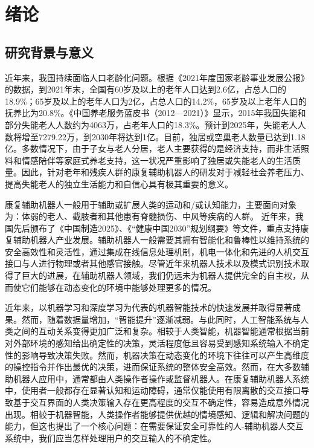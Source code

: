 
\chapter{绪论}

\section{研究背景与意义}
近年来，我国持续面临人口老龄化问题。根据《2021年度国家老龄事业发展公报》的数据\cite{2021NianDuGuoJiaLaoLingShiYeFaZhanGongBao}，到2021年末，全国有60岁及以上的老年人口达到2.6亿，占总人口的18.9\%；65岁及以上的老年人口为2亿，占总人口的14.2\%，65岁及以上老年人口的抚养比为20.8\%。《中国养老服务蓝皮书（2012—2021）》\cite{YangZhongGuoYangLaoFuWuLanPiShu201220212022}显示，2015年我国失能和部分失能老人人数约为4063万，占老年人口的18.3\%。预计到2025年，失能老人人数将增至7279.22万，到2030年将达到1亿。目前，独居或空巢老人数量已达到1.18亿。多数情况下，由于子女与老人分居，老人主要获得的是经济支持，而非生活照料和情感陪伴等家庭式养老支持，这一状况严重影响了独居或失能老人的生活质量。因此，针对老年和残疾人群的康复辅助机器人的研发对于减轻社会养老压力、提高失能老人的独立生活能力和自信心具有极其重要的意义。

康复辅助机器人一般用于辅助或扩展人类的运动和/或认知能力，主要面向对象为：体弱的老人、截肢者和其他患有脊髓损伤、中风等疾病的人群。 近年来，我国先后颁布了《中国制造2025》\cite{ZhongGuoZhiZao2025}、《“健康中国2030”规划纲要》\cite{LiuYangJianKangZhongGuo2030GuiHuaGangYao}等文件，重点支持康复辅助机器人产业发展。辅助机器人一般需要其拥有智能化和鲁棒性以维持系统的安全高效性和灵活性，通过集成在线信息处理机制，机电一体化和先进的人机交互接口与人进行物理或者其他感官接触。尽管近年来机器人技术以及模式识别技术取得了巨大的进展，在辅助机器人领域，我们仍远未为机器人提供完全的自主权，从而使它们能够在动态变化的环境中能够处理更多的情况。

近年来，以机器学习和深度学习为代表的机器智能技术的快速发展并取得显著成果。然而，随着数据量增加，``智能提升''逐渐减弱。与此同时，人工智能系统与人类之间的互动关系变得更加广泛和复杂\cite{ZhaoQianTanKongZhiZhongDeGongXiangXinXiHeGongXiangZiZhu2021}。相较于人类智能，机器智能通常根据当前对外部环境的感知给出确定性的决策，灵活程度低且容易受到感知系统输入不确定性的影响导致决策失败。然而，机器决策在动态变化的环境下往往可以产生高维度的操控指令并作出最优的决策，进而保证系统的整体安全高效。然而，在大多数辅助机器人应用中，通常都由人类操作者操作或监督机器人。在康复辅助机器人系统中，使用者一般都存在显著认知和运动障碍，通常仅能使用有限离散的交互接口导致基于交互界面的人类决策输入存在更高程度的交互不确定性，容易造成意外情况出现。相较于机器智能，人类操作者能够提供优越的情境感知、逻辑和解决问题的能力，但这也提出了一个核心问题：在需要保证安全可靠性的人-辅助机器人交互系统中，我们应当怎样处理用户的交互输入的不确定性。


